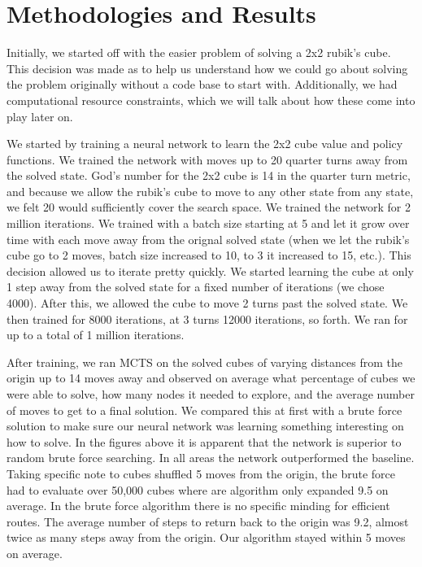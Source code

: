 \documentclass[10pt,twocolumn,letterpaper]{article}
\begin{document}
\section{Methodologies and Results}

Initially, we started off with the easier problem of solving a 2x2 rubik's cube. This decision was made as to help us understand how we could go about solving the problem originally without a code base to start with. Additionally, we had computational resource constraints, which we will talk about how these come into play later on.

We started by training a neural network to learn the 2x2 cube value and policy functions. We trained the network with moves up to 20 quarter turns away from the solved state. God's number for the 2x2 cube is 14 in the quarter turn metric, and because we allow the rubik's cube to move to any other state from any state, we felt 20 would sufficiently cover the search space. We trained the network for 2 million iterations. We trained with a batch size starting at 5 and let it grow over time with each move away from the orignal solved state (when we let the rubik's cube go to 2 moves, batch size increased to 10, to 3 it increased to 15, etc.). This decision allowed us to iterate pretty quickly.  We started learning the cube at only 1 step away from the solved state for a fixed number of iterations (we chose 4000). After this, we allowed the cube to move 2 turns past the solved state. We then trained for 8000 iterations, at 3 turns 12000 iterations, so forth. We ran for up to a total of 1 million iterations. 

After training, we ran MCTS on the solved cubes of varying distances from the origin up to 14 moves away and observed on average what percentage of cubes we were able to solve, how many nodes it needed to explore, and the average number of moves to get to a final solution. We compared this at first with a brute force solution to make sure our neural network was learning something interesting on how to solve. 
In the figures above it is apparent that the network is superior to random brute force searching.  In all areas the network outperformed the baseline.  Taking specific note to cubes shuffled 5 moves from the origin, the brute force had to evaluate over 50,000 cubes where are algorithm only expanded 9.5 on average.   In the brute force algorithm there is no specific minding for efficient routes.  The average number of steps to return back to the origin was 9.2, almost twice as many steps away from the origin.  Our algorithm stayed within 5 moves on average. 
\end{document}
